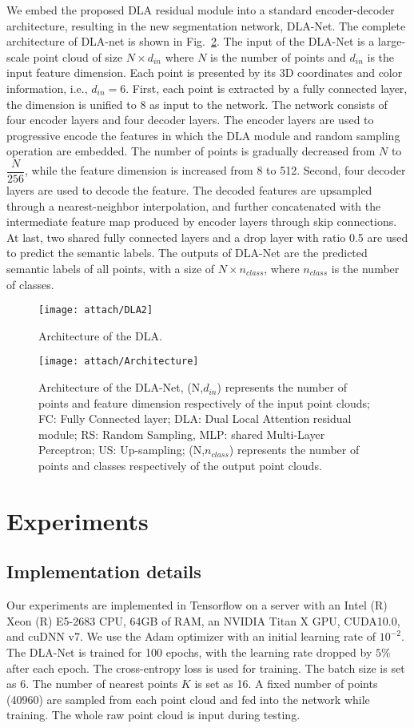 \documentclass[review]{elsarticle}
\begin{document}
We embed the proposed DLA residual module into a standard encoder-decoder architecture, resulting in the new segmentation network, DLA-Net. The complete architecture of DLA-net is shown in  Fig.~\ref{fig:Architecture}. The input of the DLA-Net is a large-scale point cloud of size $ N \times d_{in}$ where $N$ is the number of points and $d_{in}$ is the input feature dimension. Each point is presented by its 3D coordinates and color information, i.e., $d_{in}=6$. First, each point is extracted by a fully connected layer, the dimension is unified to 8 as input to the network. The network consists of four encoder layers and four decoder layers. The encoder layers are used to progressive encode the features in which the DLA module and random sampling operation are embedded. The number of points is gradually decreased from $N$ to $ \dfrac{N}{256}$, while the feature dimension is increased from 8 to 512. Second, four decoder layers are used to decode the feature. The decoded features are upsampled through a nearest-neighbor interpolation, and further concatenated with the intermediate feature map produced by encoder layers through skip connections. At last, two shared fully connected layers and a drop layer with ratio 0.5 are used to predict the semantic labels. The outputs of DLA-Net are the predicted semantic labels of all points, with a size of $N \times n_{class}$, where $n_{class}$ is the number of classes.
\begin{figure}[!t]
	\centering
	\texttt{[image: attach/DLA2]}
	\caption{Architecture of the DLA.}
	\label{fig:DLA}	
\end{figure}
\begin{figure}[!t]
	\centering
	\texttt{[image: attach/Architecture]}
	\caption{Architecture of the DLA-Net, (N,$d_{in}$) represents the number of points and feature dimension respectively of the input point clouds; FC: Fully Connected layer; DLA: Dual Local Attention residual module; RS: Random Sampling, MLP: shared Multi-Layer Perceptron; US: Up-sampling; (N,$n_{class}$) represents the number of points and classes respectively of the output point clouds.}
	\label{fig:Architecture}
\end{figure}
\section{Experiments}
\subsection{\textbf{Implementation details}}
Our experiments are implemented in Tensorflow on a server with an Intel (R) Xeon (R) E5-2683 CPU, 64GB of RAM, an NVIDIA Titan X GPU, CUDA10.0, and cuDNN v7. We use the Adam optimizer with an initial learning rate of $10^{-2}$. The DLA-Net is trained for 100 epochs, with the learning rate dropped by $5\%$ after each epoch. The cross-entropy loss is used for training. The batch size is set as 6. The number of nearest points $K$ is set as 16. A fixed number of points (40960) are sampled from each point cloud and fed into the network while training. The whole raw point cloud is input during testing.
\end{document}
